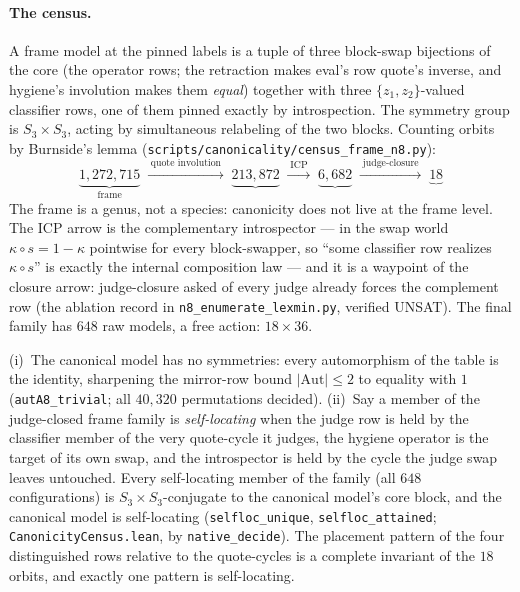 \documentclass[sigconf,screen]{acmart}
\theoremstyle{remark}
\begin{document}
\paragraph{The census.} A frame model at the pinned labels is a tuple
of three block-swap bijections of the core (the operator rows; the
retraction makes eval's row quote's inverse, and hygiene's involution
makes them \emph{equal}) together with three $\{z_1,z_2\}$-valued
classifier rows, one of them pinned exactly by introspection. The
symmetry group is $S_3 \times S_3$, acting by simultaneous relabeling
of the two blocks. Counting orbits by Burnside's lemma
(\texttt{scripts/canonicality/census\_frame\_n8.py}):
\[
\underbrace{1{,}272{,}715}_{\text{frame}}
\;\xrightarrow{\;\text{quote involution}\;}\;
\underbrace{213{,}872}_{}
\;\xrightarrow{\;\text{ICP}\;}\;
\underbrace{6{,}682}_{}
\;\xrightarrow{\;\text{judge-closure}\;}\;
\underbrace{18}_{}
\]
The frame is a genus, not a species: canonicity does not live at the
frame level. The ICP arrow is the complementary introspector --- in
the swap world $\kappa \circ s = 1 - \kappa$ pointwise for every
block-swapper, so ``some classifier row realizes
$\kappa \circ s$'' is exactly the internal composition law --- and it
is a waypoint of the closure arrow: judge-closure asked of every
judge already forces the complement row (the ablation record in
\texttt{n8\_enumerate\_lexmin.py}, verified UNSAT). The final family
has $648$ raw models, a free action: $18 \times 36$.

\begin{theorem}
\label{thm:census-canonicity}
(i)~The canonical model has no symmetries: every automorphism of the
table is the identity, sharpening the mirror-row bound
$|\mathrm{Aut}| \leq 2$ to equality with $1$
(\texttt{autA8\_trivial}; all $40{,}320$ permutations decided).
(ii)~Say a member of the judge-closed frame family is
\emph{self-locating} when the judge row is held by the classifier
member of the very quote-cycle it judges, the hygiene operator is the
target of its own swap, and the introspector is held by the cycle the
judge swap leaves untouched. Every self-locating member of the family
(all $648$ configurations) is $S_3 \times S_3$-conjugate to the
canonical model's core block, and the canonical model is
self-locating (\texttt{selfloc\_unique}, \texttt{selfloc\_attained};
\texttt{CanonicityCensus.lean}, by \texttt{native\_decide}). The
placement pattern of the four distinguished rows relative to the
quote-cycles is a complete invariant of the $18$ orbits, and exactly
one pattern is self-locating.
\end{theorem}
\end{document}
